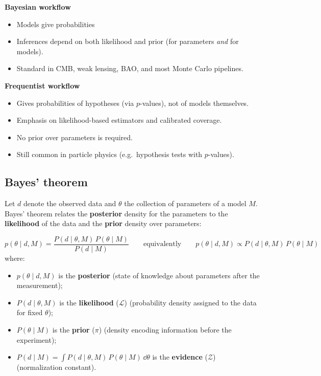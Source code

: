 \begin{minipage}{0.48\textwidth}
    \textbf{Bayesian workflow}
    \begin{itemize}[noitemsep]
        \item Models give probabilities
        \item Inferences depend on both likelihood and prior (for parameters \emph{and} for models).
        \item Standard in CMB, weak lensing, BAO, and most Monte Carlo pipelines.
    \end{itemize}
    \bigskip
    \bigskip
\end{minipage}
\hfill
\begin{minipage}{0.48\textwidth}
    \textbf{Frequentist workflow}
    \begin{itemize}[noitemsep]
        \item Gives probabilities of hypotheses (via $p$-values), not of models themselves.
        \item Emphasis on likelihood-based estimators and calibrated coverage.
        \item No prior over parameters is required.
        \item Still common in particle physics (e.g.\ hypothesis tests with $p$-values).
    \end{itemize}
\end{minipage}

\subsection{Bayes' theorem}
\label{sec:bayes_theorem}

Let $d$ denote the observed data and $\theta$ the collection of parameters of a model $M$. Bayes' theorem relates the \textbf{posterior} density for the parameters to the \textbf{likelihood} of the data and the \textbf{prior} density over parameters:

\begin{definitionblock}
    $$
    p(\theta \mid d, M)
    = \frac{P(d \mid \theta, M)\,P(\theta \mid M)}{P(d \mid M)}
    \qquad\text{equivalently}\qquad
    p(\theta \mid d, M) \propto P(d \mid \theta, M)\,P(\theta \mid M)
    $$
    where:
    \begin{itemize}
        \item $p(\theta \mid d, M)$ is the \textbf{posterior} (state of knowledge about parameters after the measurement);
        \item $P(d \mid \theta, M)$ is the \textbf{likelihood} ($\mathcal{L}$) (probability density assigned to the data for fixed $\theta$);
        \item $P(\theta \mid M)$ is the \textbf{prior} ($\pi$) (density encoding information before the experiment);
        \item $P(d \mid M) = \int P(d \mid \theta, M)\,P(\theta \mid M)\,\dd{\theta}$ is the \textbf{evidence} ($\mathcal{Z}$) (normalization constant).
    \end{itemize}
\end{definitionblock}

